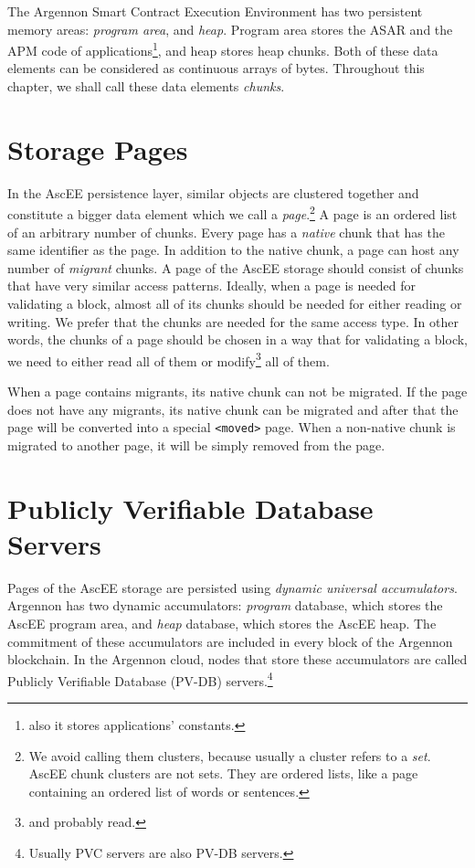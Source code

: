 
The Argennon Smart Contract Execution Environment has two persistent memory areas: \emph{program area}, and \emph{heap}.
Program area stores the ASAR and the APM code of
applications\footnote{also it stores applications' constants.}, and heap stores heap chunks.
Both of these data elements can be considered as continuous arrays of bytes.
Throughout this chapter, we shall call these data elements \emph{chunks}.


\section{Storage Pages}\label{sec:storage-pages}

In the AscEE persistence layer, similar objects are clustered together and constitute a bigger data element which we
call a \emph{page}.\footnote{We avoid calling them clusters, because usually a cluster refers to a \emph{set}. AscEE
chunk clusters are not sets. They are ordered lists, like a page containing an ordered list of words or sentences.}
A page is an ordered list of an arbitrary number of chunks. Every page has a \emph{native} chunk that has the same
identifier as the page. In addition to the native chunk, a page can host any number of \emph{migrant} chunks.
A page of the AscEE storage should consist of chunks that have very similar access patterns. Ideally, when a page is
needed for validating a block, almost all of its chunks should be needed for either reading or writing. We prefer
that the chunks are needed for the same access type. In other words, the chunks of a page should be chosen in a way that
for validating a block, we need to either read all of them or modify\footnote{and probably read.} all of them.

When a page contains migrants, its native chunk can not be migrated. If the page does not
have any migrants, its native chunk can be migrated and after that the page will be converted into a special
\texttt{<moved>} page. When a non-native chunk is migrated to another page, it will be simply removed from the page.

\section{Publicly Verifiable Database Servers}\label{sec:zk-edb}

Pages of the AscEE storage are persisted using \emph{dynamic universal accumulators}. Argennon
has two dynamic accumulators: \emph{program} database, which stores the AscEE program area, and \emph{heap} database,
which stores the AscEE heap. The commitment of these accumulators are included in every block of the Argennon
blockchain. In the Argennon cloud, nodes that store these accumulators are called Publicly Verifiable Database
(PV-DB) servers.\footnote{Usually PVC servers are also PV-DB servers.}

